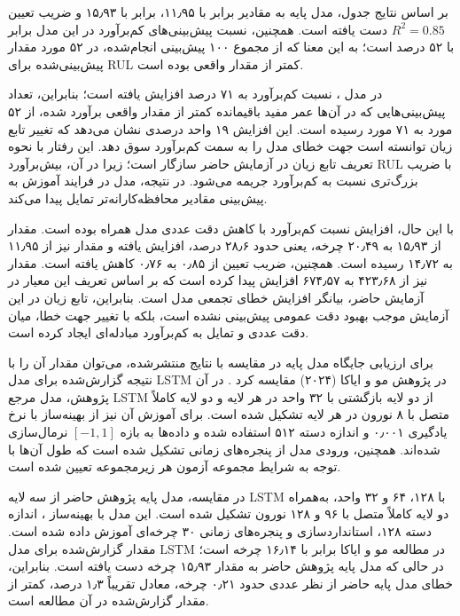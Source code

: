 بر اساس نتایج جدول، مدل پایه 
به مقادیر  برابر با ۱۱٫۹۵،
 برابر با ۱۵٫۹۳ و ضریب تعیین
$R^2=0.85$ دست یافته است. همچنین، نسبت
پیش‌بینی‌های کم‌برآورد در این مدل برابر با
۵۲ درصد است؛ به این معنا که از مجموع ۱۰۰
پیش‌بینی انجام‌شده، در ۵۲ مورد مقدار
پیش‌بینی‌شده برای \gls{RUL} کمتر از مقدار واقعی
بوده است.

در مدل ، نسبت کم‌برآورد
به ۷۱ درصد افزایش یافته است؛ بنابراین، تعداد
پیش‌بینی‌هایی که در آن‌ها عمر مفید باقیمانده
کمتر از مقدار واقعی برآورد شده، از ۵۲ مورد
به ۷۱ مورد رسیده است. این افزایش ۱۹ واحد
درصدی نشان می‌دهد که تغییر تابع زیان توانسته
است جهت خطای مدل را به سمت کم‌برآورد سوق دهد.
این رفتار با نحوه تعریف تابع زیان 
در آزمایش حاضر سازگار است؛ زیرا در آن،
بیش‌برآورد \gls{RUL} با ضریب بزرگ‌تری نسبت به
کم‌برآورد جریمه می‌شود. در نتیجه، مدل در فرایند
آموزش به پیش‌بینی مقادیر محافظه‌کارانه‌تر
تمایل پیدا می‌کند.

با این حال، افزایش نسبت کم‌برآورد با کاهش
دقت عددی مدل همراه بوده است. مقدار
 از ۱۵٫۹۳ به ۲۰٫۴۹ چرخه،
یعنی حدود ۲۸٫۶ درصد، افزایش یافته و
مقدار  نیز از ۱۱٫۹۵ به ۱۴٫۷۲
رسیده است. همچنین، ضریب تعیین از ۰٫۸۵
به ۰٫۷۶ کاهش یافته است. مقدار
 نیز از ۴۲۳٫۶۸ به
۶۷۴٫۵۷ افزایش پیدا کرده است که بر اساس
تعریف این معیار در آزمایش حاضر، بیانگر
افزایش خطای تجمعی مدل است. بنابراین،
تابع زیان  در این آزمایش موجب
بهبود دقت عمومی پیش‌بینی نشده است، بلکه
با تغییر جهت خطا، میان دقت عددی و تمایل
به کم‌برآورد مبادله‌ای ایجاد کرده است.

برای ارزیابی جایگاه مدل پایه در مقایسه با
نتایج منتشرشده، می‌توان مقدار 
آن را با نتیجه گزارش‌شده برای مدل
\gls{LSTM} در پژوهش مو و ایاکا (۲۰۲۴)
مقایسه کرد \cite{Mo2023}.
در آن پژوهش، مدل مرجع \gls{LSTM} از دو
لایه بازگشتی با ۳۲ واحد در هر لایه و
دو لایه کاملاً متصل با ۸ نورون در هر
لایه تشکیل شده است. برای آموزش آن نیز
از بهینه‌ساز  با نرخ یادگیری
۰٫۰۰۱ و اندازه دسته ۵۱۲ استفاده شده و
داده‌ها به بازه $[-1,1]$ نرمال‌سازی
شده‌اند. همچنین، ورودی مدل از پنجره‌های
زمانی تشکیل شده است که طول آن‌ها با
توجه به شرایط مجموعه آزمون هر زیرمجموعه
تعیین شده است.

در مقایسه، مدل پایه پژوهش حاضر از سه
لایه \gls{LSTM} با ۱۲۸، ۶۴ و ۳۲ واحد،
به‌همراه دو لایه کاملاً متصل با ۹۶ و
۱۲۸ نورون تشکیل شده است. این مدل با
بهینه‌ساز ، اندازه دسته ۱۲۸،
استانداردسازی  و
پنجره‌های زمانی ۳۰ چرخه‌ای آموزش داده
شده است. مقدار  گزارش‌شده
برای مدل \gls{LSTM} در مطالعه مو و ایاکا
برابر با ۱۶٫۱۴ چرخه است؛ در حالی که
مدل پایه پژوهش حاضر به مقدار ۱۵٫۹۳
چرخه دست یافته است. بنابراین، خطای
مدل پایه حاضر از نظر عددی حدود ۰٫۲۱
چرخه، معادل تقریباً ۱٫۳ درصد، کمتر از
مقدار گزارش‌شده در آن مطالعه است.

